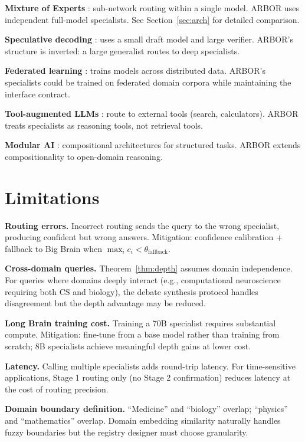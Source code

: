 \documentclass[12pt]{article}
\begin{document}
\textbf{Mixture of Experts} \cite{shazeer2017, jiang2024}: sub-network routing within a single model. ARBOR uses independent full-model specialists. See Section~\ref{sec:arch} for detailed comparison.

\textbf{Speculative decoding} \cite{leviathan2023}: uses a small draft model and large verifier. ARBOR's structure is inverted: a large generalist routes to deep specialists.

\textbf{Federated learning} \cite{mcmahan2017}: trains models across distributed data. ARBOR's specialists could be trained on federated domain corpora while maintaining the interface contract.

\textbf{Tool-augmented LLMs} \cite{schick2023}: route to external tools (search, calculators). ARBOR treats specialists as reasoning tools, not retrieval tools.

\textbf{Modular AI} \cite{andreas2016}: compositional architectures for structured tasks. ARBOR extends compositionality to open-domain reasoning.

\section{Limitations}

\textbf{Routing errors.} Incorrect routing sends the query to the wrong specialist, producing confident but wrong answers. Mitigation: confidence calibration + fallback to Big Brain when $\max_i c_i < \theta_{\text{fallback}}$.

\textbf{Cross-domain queries.} Theorem~\ref{thm:depth} assumes domain independence. For queries where domains deeply interact (e.g., computational neuroscience requiring both CS and biology), the debate synthesis protocol handles disagreement but the depth advantage may be reduced.

\textbf{Long Brain training cost.} Training a 70B specialist requires substantial compute. Mitigation: fine-tune from a base model rather than training from scratch; 8B specialists achieve meaningful depth gains at lower cost.

\textbf{Latency.} Calling multiple specialists adds round-trip latency. For time-sensitive applications, Stage 1 routing only (no Stage 2 confirmation) reduces latency at the cost of routing precision.

\textbf{Domain boundary definition.} ``Medicine'' and ``biology'' overlap; ``physics'' and ``mathematics'' overlap. Domain embedding similarity naturally handles fuzzy boundaries but the registry designer must choose granularity.
\end{document}
